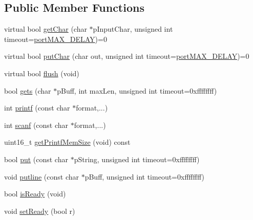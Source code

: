 \subsection*{Public Member Functions}
\begin{DoxyCompactItemize}
\item 
virtual bool \hyperlink{classCharDev_a2125f39cee4ada85091e4a5440751650}{get\+Char} (char $\ast$p\+Input\+Char, unsigned int timeout=\hyperlink{portmacro_8h_a72723ba1e4a85ca14f25c2b9e066613d}{port\+M\+A\+X\+\_\+\+D\+E\+L\+AY})=0
\item 
virtual bool \hyperlink{classCharDev_a253e32e0413b98f0af16ad79eb358851}{put\+Char} (char out, unsigned int timeout=\hyperlink{portmacro_8h_a72723ba1e4a85ca14f25c2b9e066613d}{port\+M\+A\+X\+\_\+\+D\+E\+L\+AY})=0
\item 
virtual bool \hyperlink{classCharDev_a601bd6eeee3095306c0db78798499742}{flush} (void)
\item 
bool \hyperlink{classCharDev_ad69eb66ed094d04116615248f1c2453c}{gets} (char $\ast$p\+Buff, int max\+Len, unsigned int timeout=0xffffffff)
\item 
int \hyperlink{classCharDev_a1e567da6600cd8164dcd98e11de8813f}{printf} (const char $\ast$format,...)
\item 
int \hyperlink{classCharDev_a053203d7cf010d6422b11d114d10e357}{scanf} (const char $\ast$format,...)
\item 
uint16\+\_\+t \hyperlink{classCharDev_acb3dd3805711e4aa6346fbaf25009925}{get\+Printf\+Mem\+Size} (void) const 
\end{DoxyCompactItemize}
{\bf }\par
\begin{DoxyCompactItemize}
\item 
bool \hyperlink{classCharDev_a48d2560ade054a067558a9495c41f109}{put} (const char $\ast$p\+String, unsigned int timeout=0xffffffff)
\item 
void \hyperlink{classCharDev_aac938099da1789ac7bf8c0acd7a71624}{putline} (const char $\ast$p\+Buff, unsigned int timeout=0xffffffff)
\end{DoxyCompactItemize}

{\bf }\par
\begin{DoxyCompactItemize}
\item 
bool \hyperlink{classCharDev_ab76a3b54c0ecf31b7a78a2808446eefd}{is\+Ready} (void)
\item 
void \hyperlink{classCharDev_ad845c4307699c25ccdcce07ffafc8aba}{set\+Ready} (bool r)
\end{DoxyCompactItemize}

